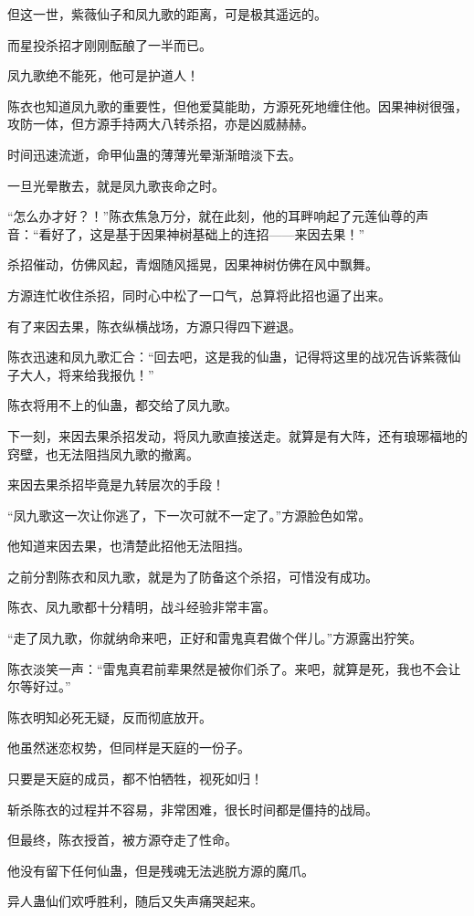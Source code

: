 \begin{this_body}
但这一世，紫薇仙子和凤九歌的距离，可是极其遥远的。

而星投杀招才刚刚酝酿了一半而已。

凤九歌绝不能死，他可是护道人！

陈衣也知道凤九歌的重要性，但他爱莫能助，方源死死地缠住他。因果神树很强，攻防一体，但方源手持两大八转杀招，亦是凶威赫赫。

时间迅速流逝，命甲仙蛊的薄薄光晕渐渐暗淡下去。

一旦光晕散去，就是凤九歌丧命之时。

“怎么办才好？！”陈衣焦急万分，就在此刻，他的耳畔响起了元莲仙尊的声音：“看好了，这是基于因果神树基础上的连招——来因去果！”

杀招催动，仿佛风起，青烟随风摇晃，因果神树仿佛在风中飘舞。

方源连忙收住杀招，同时心中松了一口气，总算将此招也逼了出来。

有了来因去果，陈衣纵横战场，方源只得四下避退。

陈衣迅速和凤九歌汇合：“回去吧，这是我的仙蛊，记得将这里的战况告诉紫薇仙子大人，将来给我报仇！”

陈衣将用不上的仙蛊，都交给了凤九歌。

下一刻，来因去果杀招发动，将凤九歌直接送走。就算是有大阵，还有琅琊福地的窍壁，也无法阻挡凤九歌的撤离。

来因去果杀招毕竟是九转层次的手段！

“凤九歌这一次让你逃了，下一次可就不一定了。”方源脸色如常。

他知道来因去果，也清楚此招他无法阻挡。

之前分割陈衣和凤九歌，就是为了防备这个杀招，可惜没有成功。

陈衣、凤九歌都十分精明，战斗经验非常丰富。

“走了凤九歌，你就纳命来吧，正好和雷鬼真君做个伴儿。”方源露出狞笑。

陈衣淡笑一声：“雷鬼真君前辈果然是被你们杀了。来吧，就算是死，我也不会让尔等好过。”

陈衣明知必死无疑，反而彻底放开。

他虽然迷恋权势，但同样是天庭的一份子。

只要是天庭的成员，都不怕牺牲，视死如归！

斩杀陈衣的过程并不容易，非常困难，很长时间都是僵持的战局。

但最终，陈衣授首，被方源夺走了性命。

他没有留下任何仙蛊，但是残魂无法逃脱方源的魔爪。

异人蛊仙们欢呼胜利，随后又失声痛哭起来。


\end{this_body}

